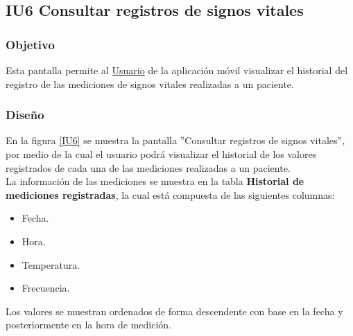 \subsection{IU6 Consultar registros de signos vitales}

\subsubsection{Objetivo}
	
Esta pantalla permite al \hyperlink{actor:usuario}{Usuario} de la aplicación móvil visualizar el historial del registro de las mediciones de signos vitales realizadas a un paciente.

\subsubsection{Diseño}
En la figura \ref{IU6} se muestra la pantalla ''Consultar registros de signos vitales'', por medio de la cual el usuario podrá visualizar el historial de los valores registrados de cada una de las mediciones realizadas a un paciente.\\

La información de las mediciones se muestra en la tabla \textbf{Historial de mediciones registradas}, la cual está compuesta de las siguientes columnas:
\begin{itemize}
	\item Fecha.
	\item Hora.
	\item Temperatura.
	\item Frecuencia.
\end{itemize}

Los valores se muestran ordenados de forma descendente con base en la fecha y posteriormente en la hora de medición.

    

\clearpage